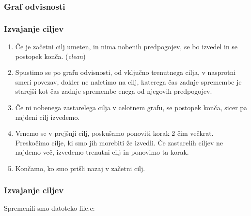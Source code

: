 \documentclass{beamer}
\begin{document}
\begin{frame}[fragile]
  \frametitle{Graf odvisnosti}
\end{frame}

\begin{frame}
  \frametitle{Izvajanje ciljev}
  
  \begin{enumerate}
  \item Če je začetni cilj umeten, in nima nobenih predpogojev, se bo
    izvedel in se postopek konča. (\textit{clean})
  \item Spustimo se po grafu odvisnosti, od vključno trenutnega cilja, v
    nasprotni smeri povezav, dokler ne naletimo na cilj, katerega čas
    zadnje spremembe je starejši kot čas zadnje spremembe enega od
    njegovih predpogojev.
  \item Če ni nobenega zastarelega cilja v celotnem grafu, se postopek
    konča, sicer pa najdeni cilj izvedemo.
  \item Vrnemo se v prejšnji cilj, poskušamo ponoviti korak 2 čim
    večkrat. Preskočimo cilje, ki smo jih morebiti že izvedli. Če
    zastarelih ciljev ne najdemo več, izvedemo trenutni cilj in ponovimo
    ta korak.
  \item Končamo, ko smo prišli nazaj v začetni cilj.
\end{enumerate}
\end{frame}

\begin{frame}[fragile]
  \frametitle{Izvajanje ciljev}
  
  Spremenili smo datoteko file.c:
\end{frame}

\begin{frame}

\end{frame}
\end{document}
